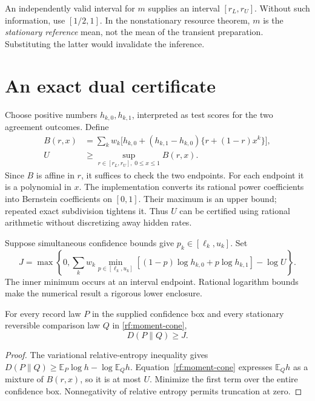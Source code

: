 An independently valid interval for $m$ supplies an interval $[r_L,r_U]$.
Without such information, use $[1/2,1]$. In the nonstationary resource theorem,
$m$ is the \emph{stationary reference} mean, not the mean of the transient
preparation. Substituting the latter would invalidate the inference.

\section{An exact dual certificate}
Choose positive numbers $h_{k,0},h_{k,1}$, interpreted as test scores for the two
agreement outcomes. Define
\begin{align}
 B(r,x)&=\sum_k w_k\bigl[h_{k,0}
 +(h_{k,1}-h_{k,0})\{r+(1-r)x^k\}\bigr],\\
 U&\geq\sup_{r\in[r_L,r_U],\;0\leq x\leq1}B(r,x).
 \label{rf:normalizer}
\end{align}
Since $B$ is affine in $r$, it suffices to check the two endpoints. For each
endpoint it is a polynomial in $x$. The implementation converts its rational
power coefficients into Bernstein coefficients on $[0,1]$. Their maximum is
an upper bound; repeated exact subdivision tightens it. Thus $U$ can be
certified using rational arithmetic without discretizing away hidden rates.

Suppose simultaneous confidence bounds give $p_k\in[\ell_k,u_k]$. Set
\begin{equation}
 J=\max\left\{0,
 \sum_k w_k\min_{p\in[\ell_k,u_k]}
       [(1-p)\log h_{k,0}+p\log h_{k,1}]-\log U\right\}.
 \label{rf:dual-J}
\end{equation}
The inner minimum occurs at an interval endpoint. Rational logarithm
bounds make the numerical result a rigorous lower enclosure.

\begin{proposition}
For every record law $P$ in the supplied confidence box and every stationary
reversible comparison law $Q$ in \eqref{rf:moment-cone},
\[
 D(P\|Q)\geq J.
\]
\end{proposition}
\begin{proof}
The variational relative-entropy inequality gives
$D(P\|Q)\geq\mathbb E_P\log h-\log\mathbb E_Q h$.
Equation~\eqref{rf:moment-cone} expresses $\mathbb E_Qh$ as a mixture of
$B(r,x)$, so it is at most $U$. Minimize the first term over the entire
confidence box. Nonnegativity of relative entropy permits truncation at zero.
\end{proof}

